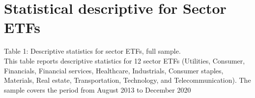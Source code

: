 \documentclass{article}
\begin{document}

\section{Statistical descriptive for Sector ETFs}

\begin{landscape}
\begin{table}[h]
\centering

    \setlength{\tabcolsep}{2pt}
    \small\sffamily\centering

 \caption{Table 1: Descriptive statistics for sector ETFs, full sample.\\
This table reports descriptive statistics for 12 sector ETFs (Utilities, Consumer, Financials, Financial services, Healthcare, Industrials, Consumer staples, Materials, Real estate, Transportation, Technology, and Telecommunication). The sample covers the period from August 2013 to December 2020}


\end{table}
\end{landscape}
\end{document}
